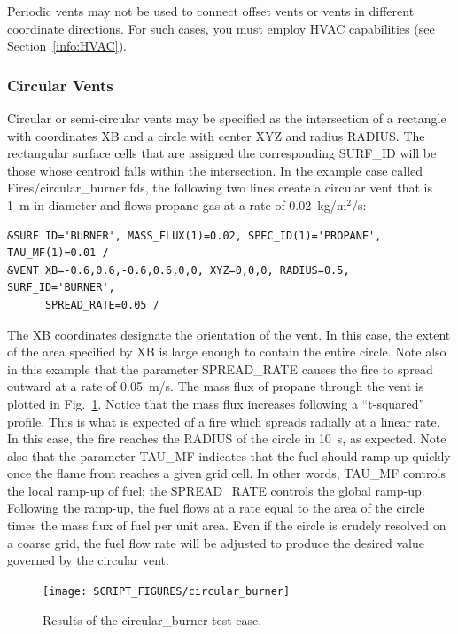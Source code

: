 \documentclass[11pt]{book}
\begin{document}
Periodic vents may not be used to connect offset vents or vents in different coordinate directions.  For such cases, you must employ HVAC capabilities (see Section~\ref{info:HVAC}).

\subsubsection{Circular Vents}
\label{sec:circvents}
\label{circular_burner}

Circular or semi-circular vents may be specified as the intersection of a rectangle with coordinates {\ct XB} and a circle with center {\ct XYZ} and radius {\ct RADIUS}.  The rectangular surface cells that are assigned the corresponding {\ct SURF\_ID} will be those whose centroid falls within the intersection. In the example case called {\ct Fires/circular\_burner.fds}, the following two lines create a circular vent that is 1~m in diameter and flows propane gas at a rate of 0.02~kg/m$^2$/s:
\begin{lstlisting}
&SURF ID='BURNER', MASS_FLUX(1)=0.02, SPEC_ID(1)='PROPANE', TAU_MF(1)=0.01 /
&VENT XB=-0.6,0.6,-0.6,0.6,0,0, XYZ=0,0,0, RADIUS=0.5, SURF_ID='BURNER',
      SPREAD_RATE=0.05 /
\end{lstlisting}
The {\ct XB} coordinates designate the orientation of the vent. In this case, the extent of the area specified by {\ct XB} is large enough to contain the entire circle. Note also in this example that the parameter {\ct SPREAD\_RATE} causes the fire to spread outward at a rate of 0.05~m/s. The mass flux of propane through the vent is plotted in Fig.~\ref{circ_burn}. Notice that the mass flux increases following a ``t-squared'' profile. This is what is expected of a fire which spreads radially at a linear rate. In this case, the fire reaches the {\ct RADIUS} of the circle in 10~s, as expected. Note also that the parameter {\ct TAU\_MF} indicates that the fuel should ramp up quickly once the flame front reaches a given grid cell. In other words, {\ct TAU\_MF} controls the local ramp-up of fuel; the {\ct SPREAD\_RATE} controls the global ramp-up. Following the ramp-up, the fuel flows at a rate equal to the area of the circle times the mass flux of fuel per unit area. Even if the circle is crudely resolved on a coarse grid, the fuel flow rate will be adjusted to produce the desired value governed by the circular vent.
\begin{figure}[h]
\begin{center}
\texttt{[image: SCRIPT\_FIGURES/circular\_burner]}
\caption[Results of the {\ct circular\_burner} test case]{Results of the {\ct circular\_burner} test case.}
\label{circ_burn}
\end{center}
\end{figure}
\end{document}
